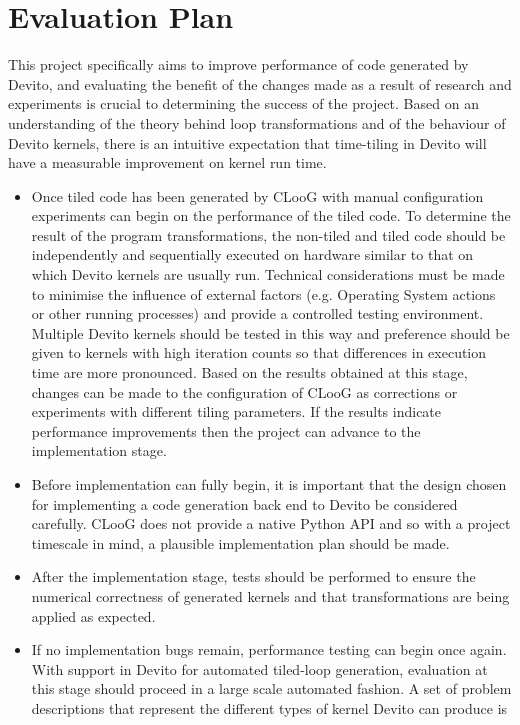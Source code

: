 \documentclass[a4paper,12pt,twoside]{report}
\begin{document}
\chapter{Evaluation Plan}
This project specifically aims to improve performance of code generated by Devito, and evaluating the benefit of the changes made
as a result of research and experiments is crucial to determining the success of the project. Based on an understanding of the theory
behind loop transformations and of the behaviour of Devito kernels, there is an intuitive expectation that time-tiling in Devito will 
have a measurable improvement on kernel run time.
\begin{itemize}
    \item Once tiled code has been generated by CLooG with manual configuration experiments can begin on the performance
        of the tiled code. To determine the result of the program transformations, the non-tiled and tiled code should be independently
        and sequentially executed on hardware similar to that on which Devito kernels are usually run. Technical considerations must be made
        to minimise the influence of external factors (e.g. Operating System actions or other running processes) and provide a controlled testing
        environment. Multiple Devito kernels should be tested in this way and preference should be given to kernels with high iteration counts
        so that differences in execution time are more pronounced. Based on the results obtained at this stage, changes can be made to the configuration
        of CLooG as corrections or experiments with different tiling parameters. If the results indicate performance improvements then the project can advance
        to the implementation stage.
    \item Before implementation can fully begin, it is important that the design chosen for implementing a code generation back end to Devito be considered carefully.
        CLooG does not provide a native Python API and so with a project timescale in mind, a plausible implementation plan should be made.
    \item After the implementation stage, tests should be performed to ensure the numerical correctness of generated kernels and that transformations are
        being applied as expected.
    \item If no implementation bugs remain, performance testing can begin once again. With support in Devito for automated tiled-loop generation, evaluation at this
        stage should proceed in a large scale automated fashion. A set of problem descriptions that represent the different types of kernel Devito can produce is

\end{itemize}
\end{document}
